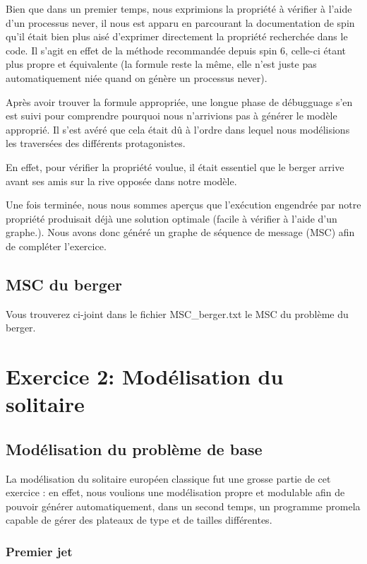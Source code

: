 \documentclass[12pt, a4paper]{report}
\begin{document}
Bien que dans un premier temps, nous exprimions la propriété à vérifier à l'aide d'un processus never, il nous est apparu en parcourant la documentation de spin qu'il était bien plus aisé d'exprimer directement la propriété recherchée dans le code. Il s'agit en effet de la méthode recommandée depuis spin 6, celle-ci étant plus propre et équivalente (la formule reste la même, elle n'est juste pas automatiquement niée quand on génère un processus never).

Après avoir trouver la formule appropriée, une longue phase de débugguage s'en est suivi pour comprendre pourquoi nous n'arrivions pas à générer le modèle approprié. Il s'est avéré que cela était dû à l'ordre dans lequel nous modélisions les traversées des différents protagonistes.

En effet, pour vérifier la propriété voulue, il était essentiel que le berger arrive avant ses amis sur la rive opposée dans notre modèle.

Une fois terminée, nous nous sommes aperçus que l'exécution engendrée par notre propriété produisait déjà une solution optimale (facile à vérifier à l'aide d'un graphe.). Nous avons donc généré un graphe de séquence de message (MSC) afin de compléter l'exercice.

\subsection{MSC du berger}

Vous trouverez ci-joint dans le fichier MSC\_berger.txt le MSC du problème du berger.

\section{Exercice 2: Modélisation du solitaire}

\subsection{Modélisation du problème de base}

La modélisation du solitaire européen classique fut une grosse partie de cet exercice : en effet, nous voulions une modélisation propre et modulable afin de pouvoir générer automatiquement, dans un second temps, un programme promela capable de gérer des plateaux de type et de tailles différentes.

\subsubsection{Premier jet}
\end{document}
